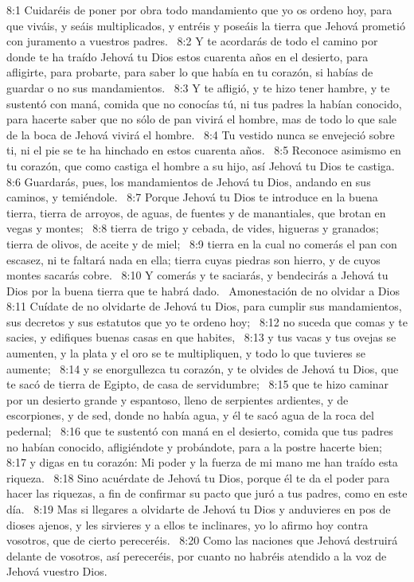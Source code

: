 8:1 Cuidaréis de poner por obra todo mandamiento que yo os ordeno hoy, para que viváis, y seáis multiplicados, y entréis y poseáis la tierra que Jehová prometió con juramento a vuestros padres.  
8:2 Y te acordarás de todo el camino por donde te ha traído Jehová tu Dios estos cuarenta años en el desierto, para afligirte, para probarte, para saber lo que había en tu corazón, si habías de guardar o no sus mandamientos.  
8:3 Y te afligió, y te hizo tener hambre, y te sustentó con maná, comida que no conocías tú, ni tus padres la habían conocido, para hacerte saber que no sólo de pan vivirá el hombre, mas de todo lo que sale de la boca de Jehová vivirá el hombre.  
8:4 Tu vestido nunca se envejeció sobre ti, ni el pie se te ha hinchado en estos cuarenta años.  
8:5 Reconoce asimismo en tu corazón, que como castiga el hombre a su hijo, así Jehová tu Dios te castiga.  
8:6 Guardarás, pues, los mandamientos de Jehová tu Dios, andando en sus caminos, y temiéndole.  
8:7 Porque Jehová tu Dios te introduce en la buena tierra, tierra de arroyos, de aguas, de fuentes y de manantiales, que brotan en vegas y montes;  
8:8 tierra de trigo y cebada, de vides, higueras y granados; tierra de olivos, de aceite y de miel;  
8:9 tierra en la cual no comerás el pan con escasez, ni te faltará nada en ella; tierra cuyas piedras son hierro, y de cuyos montes sacarás cobre.  
8:10 Y comerás y te saciarás, y bendecirás a Jehová tu Dios por la buena tierra que te habrá dado.  
Amonestación de no olvidar a Dios  
8:11 Cuídate de no olvidarte de Jehová tu Dios, para cumplir sus mandamientos, sus decretos y sus estatutos que yo te ordeno hoy;  
8:12 no suceda que comas y te sacies, y edifiques buenas casas en que habites,  
8:13 y tus vacas y tus ovejas se aumenten, y la plata y el oro se te multipliquen, y todo lo que tuvieres se aumente;  
8:14 y se enorgullezca tu corazón, y te olvides de Jehová tu Dios, que te sacó de tierra de Egipto, de casa de servidumbre;  
8:15 que te hizo caminar por un desierto grande y espantoso, lleno de serpientes ardientes, y de escorpiones, y de sed, donde no había agua, y él te sacó agua de la roca del pedernal;  
8:16 que te sustentó con maná en el desierto, comida que tus padres no habían conocido, afligiéndote y probándote, para a la postre hacerte bien;  
8:17 y digas en tu corazón: Mi poder y la fuerza de mi mano me han traído esta riqueza.  
8:18 Sino acuérdate de Jehová tu Dios, porque él te da el poder para hacer las riquezas, a fin de confirmar su pacto que juró a tus padres, como en este día.  
8:19 Mas si llegares a olvidarte de Jehová tu Dios y anduvieres en pos de dioses ajenos, y les sirvieres y a ellos te inclinares, yo lo afirmo hoy contra vosotros, que de cierto pereceréis.  
8:20 Como las naciones que Jehová destruirá delante de vosotros, así pereceréis, por cuanto no habréis atendido a la voz de Jehová vuestro Dios.  
